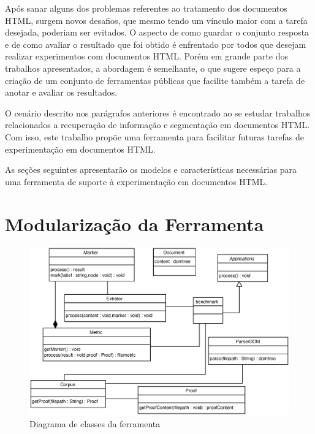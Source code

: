 \documentclass[12pt, a4paper]{article}
\begin{document}


Após sanar alguns dos problemas referentes ao tratamento dos documentos
HTML, surgem novos desafios, que mesmo tendo um vínculo maior com a tarefa
desejada, poderiam ser evitados. O aspecto de como guardar o conjunto
resposta e de como avaliar o resultado que foi obtido é enfrentado por
todos que desejam realizar experimentos com documentos HTML. Porém em
grande parte dos trabalhos apresentados, a abordagem é semelhante, o que
sugere espeço para a criação de um conjunto de ferramentas públicas que
facilite também a tarefa de anotar e avaliar os resultados.

O cenário descrito nos parágrafos anteriores é encontrado ao se estudar 
trabalhos relacionados a recuperação de informação e segmentação em documentos
HTML. Com isso, este trabalho propõe uma ferramenta para
facilitar futuras tarefas de experimentação em documentos HTML.

As seções seguintes apresentarão os modelos e características
necessárias para uma ferramenta de suporte à experimentação em
documentos HTML.

\section{Modularização da Ferramenta}

\begin{figure}[htb]
  \begin{center}
  \includegraphics[width=13cm]{img/classes.eps}
  \caption{Diagrama de classes da ferramenta}
  \label{classes}
  \end{center}
\end{figure}
\end{document}
